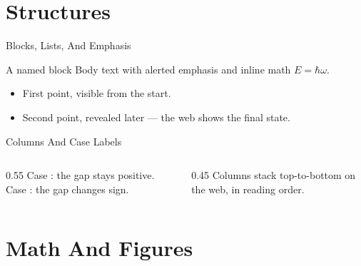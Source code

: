 
\begin{frame}
  \titlepage
  \begin{center}\small\courseurl\end{center}
\end{frame}

\announcementsframe

\section{Structures}

\begin{frame}{Blocks, Lists, And Emphasis}
  \begin{block}{A named block}
    Body text with \alert{alerted emphasis} and inline math $E=\hbar\omega$.
  \end{block}
  \begin{itemize}
    \item<1-> First point, visible from the start.
    \item<2-> Second point, revealed later — the web shows the final state.
  \end{itemize}
\end{frame}

\begin{frame}{Columns And Case Labels}
  \begin{columns}
    \begin{column}{0.55\textwidth}
      Case : the gap stays positive.
      Case : the gap changes sign.
    \end{column}
    \begin{column}{0.45\textwidth}
      Columns stack top-to-bottom on the web, in reading order.
    \end{column}
  \end{columns}
\end{frame}

\section{Math And Figures}

